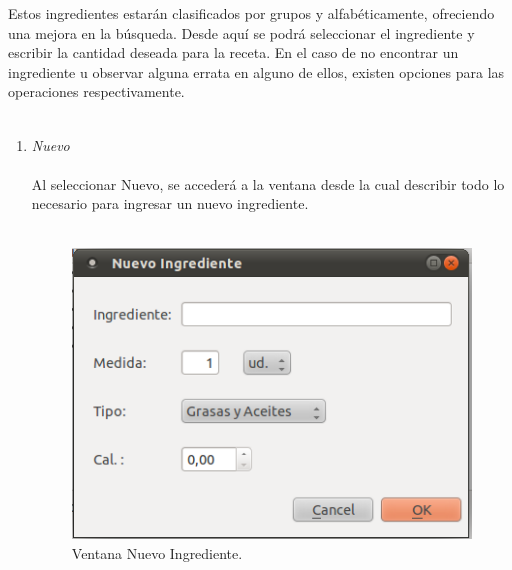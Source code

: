 \begin{enumerate}
\begin{enumerate}
Estos ingredientes estarán clasificados por grupos y alfabéticamente, ofreciendo una mejora en la búsqueda.
Desde aquí se podrá seleccionar el ingrediente y escribir la cantidad deseada para la receta.
En el caso de no encontrar un ingrediente u observar alguna errata en alguno de ellos, existen opciones para las operaciones respectivamente.\\\\
\begin{enumerate}
\item \textit{Nuevo}\\\\
Al seleccionar Nuevo, se accederá a la ventana desde la cual describir todo lo necesario para ingresar un nuevo ingrediente.\\\\
\begin{figure}[H]
  \label{nuevo_ingred}
  \begin{center}
    \includegraphics[scale=0.5]{../../Image/ingrediente-nuevo.png}
  \end{center}
  \caption{Ventana Nuevo Ingrediente.}
\end{figure}


\end{enumerate}
\end{enumerate}
\end{enumerate}

